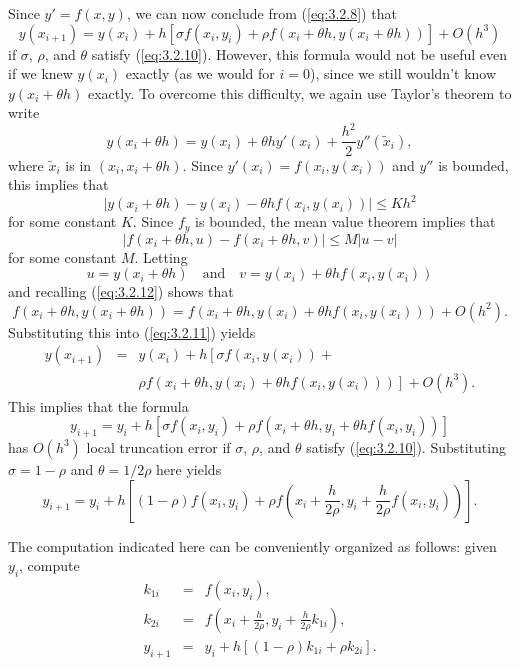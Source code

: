 \documentclass{ximera}
\begin{document}
Since $y'=f(x,y)$, we can now conclude from (\ref{eq:3.2.8}) that
\begin{equation} \label{eq:3.2.11}
y(x_{i+1})=y(x_i)+h\left[\sigma f(x_i,y_i)+\rho f(x_i+\theta
h,y(x_i+\theta h))\right]+O(h^3)
\end{equation}
if $\sigma$, $\rho$, and $\theta$ satisfy (\ref{eq:3.2.10}). However,
this formula would not be useful even if we knew $y(x_i)$ exactly (as
we would for $i=0$), since we still wouldn't know $y(x_i+\theta h)$
exactly. To overcome this difficulty, we again use Taylor's theorem to
write
$$
y(x_i+\theta h)=y(x_i)+\theta h y'(x_i)+\frac{h^2}{2}y''(\tilde x_i),
$$
where $\tilde x_i$ is in $(x_i,x_i+\theta h)$. Since
$y'(x_i)=f(x_i,y(x_i))$ and $y''$ is bounded, this implies that
\begin{equation} \label{eq:3.2.12}
|y(x_i+\theta h)-y(x_i)-\theta h f(x_i,y(x_i))|\leq Kh^2
\end{equation}
for some constant $K$. Since $f_y$ is bounded, the mean value theorem
implies that
$$
|f(x_i+\theta h,u)-f(x_i+\theta h,v)|\leq M|u-v|
$$
for some constant $M$. Letting
$$
u=y(x_i+\theta h)\quad\mbox{and}\quad
v=y(x_i)+\theta h f(x_i,y(x_i))
$$
and recalling (\ref{eq:3.2.12}) shows that
$$
f(x_i+\theta h,y(x_i+\theta h))=f(x_i+\theta h,y(x_i)+\theta h
f(x_i,y(x_i)))+O(h^2).
$$
Substituting this into (\ref{eq:3.2.11})   yields
\begin{eqnarray*}
y(x_{i+1})&=&y(x_i)+h\left[\sigma f(x_i,y(x_i))+\right.\\&&\left.\rho
f(x_i+\theta h,y(x_i)+\theta hf(x_i,y(x_i)))\right]+O(h^3).
\end{eqnarray*}
This implies that the formula
$$
y_{i+1}=y_i+h\left[\sigma f(x_i,y_i)+\rho f(x_i+\theta
h,y_i+\theta hf(x_i,y_i))\right]
$$
has $O(h^3)$ local truncation error if $\sigma$, $\rho$, and $\theta$
satisfy (\ref{eq:3.2.10}). Substituting $\sigma=1-\rho$ and
$\theta=1/2\rho$ here yields
\begin{equation} \label{eq:3.2.13}
y_{i+1}=y_i+h\left[(1-\rho)f(x_i,y_i)+\rho
f\left(x_i+\frac{h}{2\rho},
y_i+\frac{h}{2\rho}f(x_i,y_i)\right)\right].
\end{equation}

The computation indicated here can be conveniently organized as
follows: given $y_i$, compute
\begin{eqnarray*}
k_{1i}&=&f(x_i,y_i),\\
k_{2i}&=&f\left(x_i+\frac{h}{2\rho},
y_i+\frac{h}{2\rho}k_{1i}\right),\\
y_{i+1}&=&y_i+h[(1-\rho)k_{1i}+\rho k_{2i}].
\end{eqnarray*}
\end{document}
